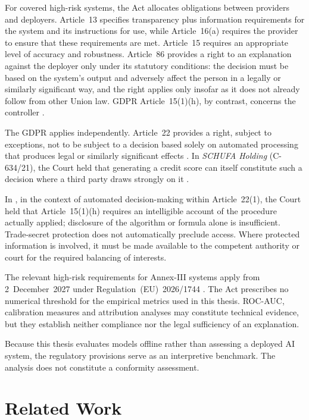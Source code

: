 For covered high-risk systems, the Act allocates obligations between providers and
deployers. Article~13 specifies transparency plus information requirements for the
system and its instructions for use, while Article~16(a) requires the provider to
ensure that these requirements are met. Article~15 requires an appropriate level of
accuracy and robustness. Article~86 provides a right to an explanation against the
deployer only under its statutory conditions: the decision must be based on the
system's output and adversely affect the person in a legally or similarly significant
way, and the right applies only insofar as it does not already follow from other Union
law. GDPR Article~15(1)(h), by contrast, concerns the controller \citep{EUAIAct2024, mullerAIbasedCreditScoring2025, GDPR2016}.

The GDPR applies independently. Article~22 provides a right, subject to exceptions,
not to be subject to a decision based solely on automated processing that produces
legal or similarly significant effects \citep{GDPR2016}. In
\emph{SCHUFA Holding} (C-634/21), the Court held that generating a credit score can
itself constitute such a decision where a third party draws strongly on it
\citep{OQGegenLand2023, mullerAIbasedCreditScoring2025}.

In \citet{CJEU2025DunBradstreet}, in the context of automated decision-making
within Article~22(1), the Court held that Article~15(1)(h) requires an intelligible
account of the procedure actually applied; disclosure of the algorithm or formula
alone is insufficient. Trade-secret
protection does not automatically preclude access. Where protected information is
involved, it must be made available to the competent authority or court for the
required balancing of interests.

The relevant high-risk requirements for Annex-III systems apply from
2~December~2027 under Regulation~(EU)~2026/1744
\citep{EUAIOmnibus2026}. The Act prescribes no numerical threshold for the
empirical metrics used in this thesis. ROC-AUC, calibration measures and attribution
analyses may constitute technical evidence, but they establish neither compliance nor
the legal sufficiency of an explanation.

Because this thesis evaluates models offline rather than assessing a deployed AI
system, the regulatory provisions serve as an interpretive benchmark. The analysis
does not constitute a conformity assessment.

\section{Related Work}

